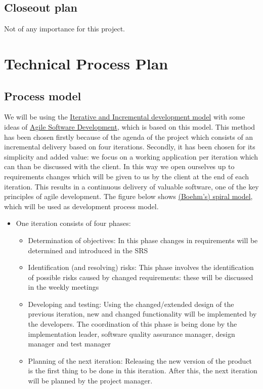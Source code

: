 \documentclass[9pt]{article}
\begin{document}
\subsection{Closeout plan}\label{closeout-plan}

Not of any importance for this project.

\section{Technical Process Plan}\label{technical-process-plan}

\subsection{Process model}\label{process-model}

We will be using the \hyperref[IterativeIncremental]{Iterative and
Incremental development model} with some ideas of
\hyperref[AgileDev]{Agile Software Development}, which is based on this
model. This method has been chosen firstly because of the agenda of the
project which consists of an incremental delivery based on four
iterations. Secondly, it has been chosen for its simplicity and added
value: we focus on a working application per iteration which can than be
discussed with the client. In this way we open ourselves up to
requirements changes which will be given to us by the client at the end
of each iteration. This results in a continuous delivery of valuable
software, one of the key principles of agile development. The figure
below shows \hyperref[SpiralModel]{(Boehm's) spiral model}, which will
be used as development process model.

\begin{itemize}
\itemsep1pt\parskip0pt
\item
  One iteration consists of four phases:

  \begin{itemize}
  \itemsep1pt\parskip0pt
  \item
    Determination of objectives: In this phase changes in requirements
    will be determined and introduced in the SRS\\
  \item
    Identification (and resolving) risks: This phase involves the
    identification of possible risks caused by changed requirements:
    these will be discussed in the weekly meetings
  \item
    Developing and testing: Using the changed/extended design of the
    previous iteration, new and changed functionality will be
    implemented by the developers. The coordination of this phase is
    being done by the implementation leader, software quality assurance
    manager, design manager and test manager
  \item
    Planning of the next iteration: Releasing the new version of the
    product is the first thing to be done in this iteration. After this,
    the next iteration will be planned by the project manager.
  \end{itemize}
\end{itemize}
\end{document}

